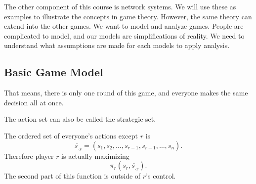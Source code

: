 The other component of this course is network systems.
We will use these as examples to illustrate the concepts in game theory. However, the same theory can extend into the other games.
We want to model and analyze games. People are complicated to model, and our models are simplifications of reality. We need to understand what assumptions are made for each models to apply analysis. 

\subsection*{Basic Game Model}
That means, there is only one round of this game, and everyone makes the same decision all at once.
\begin{remark}
    The action set can also be called the strategic set.
\end{remark}
\begin{notation}
    The ordered set of everyone's actions except $r$ is \[
    \overline{s_.}_r=(s_1,s_2,\ldots, s_{r-1},s_{r+1},\ldots,s_n).
    \]
    Therefore player $r$ is actually maximizing \[
    \pi_r(s_r,\overline{s_.}_r).
    \]
    The second part of this function is outside of $r$'s control.
\end{notation}

